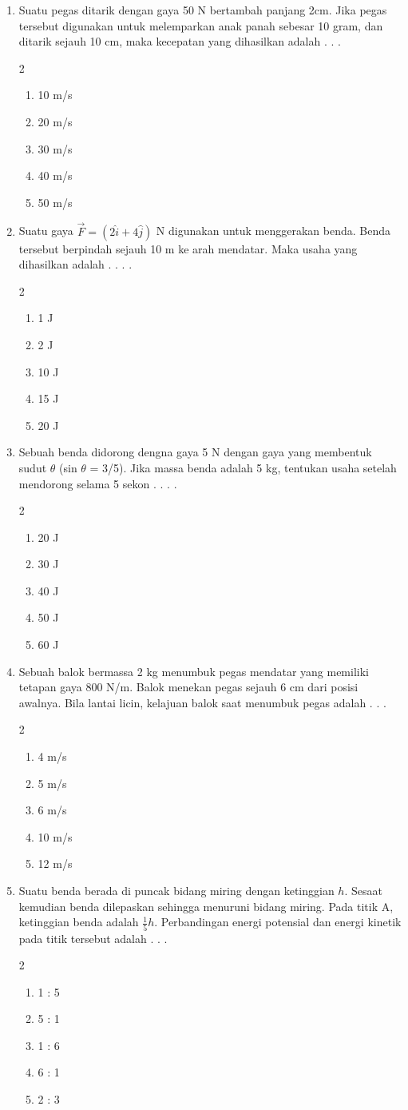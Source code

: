 \documentclass[11pt,a4paper]{article}
\newcommand{\pilgani}[1]{                            \vspace{-0.3cm}\begin{multicols}{2}
 \begin{enumerate}[label=\Alph*., itemsep=0pt,topsep=0pt,leftmargin=*,align=Center]#1                     \end{enumerate}
 \phantom{ini cuma sapi, wedus, dan ayam}
 \end{multicols}}
\begin{document}
\begin{enumerate}
         
\item Suatu pegas ditarik dengan gaya 50 N bertambah panjang 2cm. Jika pegas tersebut digunakan untuk melemparkan anak panah sebesar 10 gram, dan ditarik sejauh 10 cm, maka kecepatan yang dihasilkan adalah . . . 
    \pilgani{
        \item 10 m/s
        \item 20 m/s
        \item 30 m/s
        \item 40 m/s
        \item 50 m/s
    }  \vspace{2cm}

\item Suatu gaya $\vec{F}=(2\hat{i}+4\hat{j})$ N digunakan untuk menggerakan benda. Benda tersebut berpindah sejauh 10 m ke arah mendatar. Maka usaha yang dihasilkan adalah . . . .
    \pilgani{
        \item 1 J
        \item 2 J
        \item 10 J
        \item 15 J
        \item 20 J 
    }  \vspace{2cm}


\item Sebuah benda didorong dengna gaya 5 N dengan gaya yang membentuk sudut $\theta$ (sin $\theta$ = 3/5). Jika massa benda adalah 5 kg, tentukan usaha setelah mendorong selama 5 sekon . . . .
	\pilgani{
	\item 20 J
	\item 30 J
	\item 40 J
	\item 50 J
	\item 60 J }   \vspace{2cm}
	
\item Sebuah balok bermassa 2 kg menumbuk pegas mendatar yang memiliki tetapan gaya 800 N/m. Balok menekan pegas sejauh 6 cm dari posisi awalnya. Bila lantai licin, kelajuan balok saat menumbuk pegas adalah . . . 
\pilgani{
	\item 4 m/s
	\item 5 m/s
	\item 6 m/s
	\item 10 m/s
	\item 12 m/s
	}    \vspace{2cm}
	
\item Suatu benda berada di puncak bidang miring dengan ketinggian $h$. Sesaat kemudian benda dilepaskan sehingga menuruni bidang miring. Pada titik A, ketinggian benda adalah $\frac{1}{5} h$. Perbandingan energi potensial dan energi kinetik pada titik tersebut adalah . . .
\pilgani{
	\item 1 : 5
	\item 5 : 1
	\item 1 : 6
	\item 6 : 1
	\item 2 : 3 }   \vspace{2cm}
	

\end{enumerate}
\end{document}
